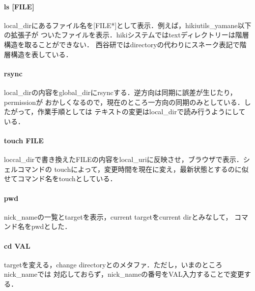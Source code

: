 \paragraph{ls [FILE]}
local\_dirにあるファイル名を[FILE*]として表示．例えば，hikiutils\_yamane以下の拡張子が
ついたファイルを表示．hikiシステムではtextディレクトリーは階層構造を取ることができない．
西谷研ではdirectoryの代わりにスネーク表記で階層構造を表している．

\paragraph{rsync}
local\_dirの内容をglobal\_dirにrsyncする．逆方向は同期に誤差が生じたり，permissionが
おかしくなるので，現在のところ一方向の同期のみとしている．したがって，作業手順としては
テキストの変更はlocal\_dirで読み行うようにしている．

\paragraph{touch FILE}
loccal\_dirで書き換えたFILEの内容をlocal\_uriに反映させ，ブラウザで表示．シェルコマンドの
touchによって，変更時間を現在に変え，最新状態とするのに似せてコマンド名をtouchとしている．

\paragraph{pwd}
nick\_nameの一覧とtargetを表示，current targetをcurrent dirとみなして，
コマンド名をpwdとした．

\paragraph{cd VAL}
targetを変える，change directoryとのメタファ．ただし，いまのところnick\_nameでは
対応しておらず，nick\_nameの番号をVAL入力することで変更する．

